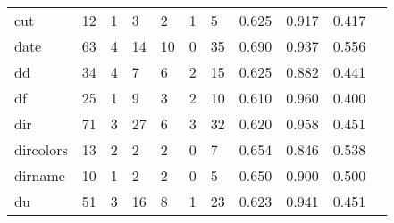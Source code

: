\begin{longtable}{lp{1.10cm}p{1.10cm}p{1.10cm}p{1.10cm}p{1.10cm}p{1.10cm}p{1.10cm}p{1.10cm}p{1.10cm}p{1.10cm}}
cut       &                     12 &                                  1 &                                 3 &                                2 &                                 1 &                               5 &                          0.625 &                                 0.917 &                               0.417 \\
date      &                     63 &                                  4 &                                14 &                               10 &                                 0 &                              35 &                          0.690 &                                 0.937 &                               0.556 \\
dd        &                     34 &                                  4 &                                 7 &                                6 &                                 2 &                              15 &                          0.625 &                                 0.882 &                               0.441 \\
df        &                     25 &                                  1 &                                 9 &                                3 &                                 2 &                              10 &                          0.610 &                                 0.960 &                               0.400 \\
dir       &                     71 &                                  3 &                                27 &                                6 &                                 3 &                              32 &                          0.620 &                                 0.958 &                               0.451 \\
dircolors &                     13 &                                  2 &                                 2 &                                2 &                                 0 &                               7 &                          0.654 &                                 0.846 &                               0.538 \\
dirname   &                     10 &                                  1 &                                 2 &                                2 &                                 0 &                               5 &                          0.650 &                                 0.900 &                               0.500 \\
du        &                     51 &                                  3 &                                16 &                                8 &                                 1 &                              23 &                          0.623 &                                 0.941 &                               0.451 \\

\end{longtable}
